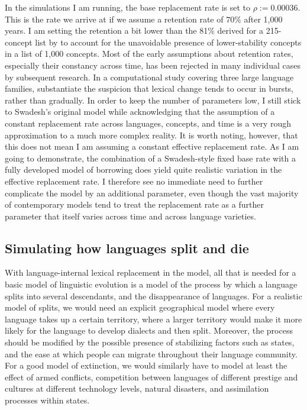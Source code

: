 In the simulations I am running, the base replacement rate is set to $\rho := 0.00036$. This is the rate we arrive at if we assume a retention rate of $70\%$ after 1,000 years. I am setting the retention a bit lower than the 81\% derived for a 215-concept list by \cite{swadesh1955} to account for the unavoidable presence of lower-stability concepts in a list of 1,000 concepts. Most of the early assumptions about retention rates, especially their constancy across time, has been rejected in many individual cases by subsequent research. In a computational study covering three large language families, \cite{atkinson_ea_2008} substantiate the suspicion that lexical change tends to occur in bursts, rather than gradually. In order to keep the number of parameters low, I still stick to Swadesh's original model while acknowledging that the assumption of a constant replacement rate across languages, concepts, and time is a very rough approximation to a much more complex reality. It is worth noting, however, that this does not mean I am assuming a constant effective replacement rate. As I am going to demonstrate, the combination of a Swadesh-style fixed base rate with a fully developed model of borrowing does yield quite realistic variation in the effective replacement rate. I therefore see no immediate need to further complicate the model by an additional parameter, even though the vast majority of contemporary models tend to treat the replacement rate as a further parameter that itself varies across time and across language varieties.

\subsection{Simulating how languages split and die}
With language-internal lexical replacement in the model, all that is needed for a basic model of linguistic evolution is a model of the process by which a language splits into several descendants, and the disappearance of languages. For a realistic model of splits, we would need an explicit geographical model where every language takes up a certain territory, where a larger territory would make it more likely for the language to develop dialects and then split. Moreover, the process should be modified by the possible presence of stabilizing factors such as states, and the ease at which people can migrate throughout their language community. For a good model of extinction, we would similarly have to model at least the effect of armed conflicts, competition between languages of different prestige and cultures at different technology levels, natural disasters, and assimilation processes within states.

